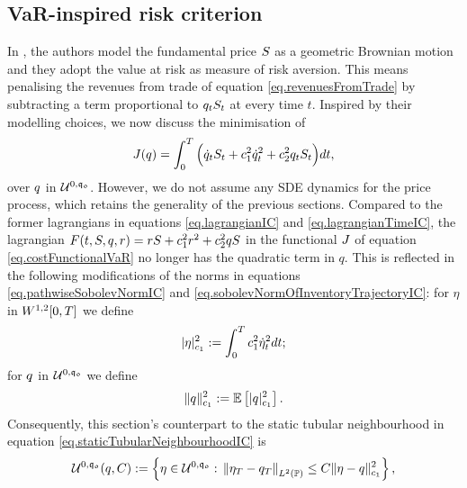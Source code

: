 \documentclass[10pt,a4paper]{article}
\begin{document}
\subsection{VaR-inspired risk criterion}\label{sec.varInspiredRiskCriterion}
In \cite{GS11opt}, the authors model the fundamental price $\fundamentalPrice$ as a geometric Brownian motion and they adopt the value at risk as measure of risk aversion. This means penalising the revenues from trade of equation \eqref{eq.revenuesFromTrade} by subtracting a term proportional to $\inventory_t \fundamentalPrice_t$ at every time $t$. Inspired by their modelling choices, we now discuss the minimisation of 
\begin{equation}\label{eq.costFunctionalVaR}
\costFunctional(\inventory)=
\int_{0}^{\timeHorizon} 
\Big(
 \inventoryRate_{t} \fundamentalPrice_t + \coeffMarketImpact\squared \inventoryRate_{t}\squared + \coeffRiskAversion\squared \inventory_t \fundamentalPrice_t
\Big)
dt,
\end{equation}
over $\inventory$ in $\spaceUnbiasedInventoryTrajectoriesInitialConstraint$. However, we do not assume any SDE dynamics for the price process, which retains the generality of the previous sections. Compared to the former lagrangians in equations \eqref{eq.lagrangianIC} and \eqref{eq.lagrangianTimeIC}, the lagrangian $F(t,S,q,r)= r S + \coeffMarketImpact\squared r\squared + \coeffRiskAversion\squared q \fundamentalPrice$ in the functional $\costFunctional$ of equation \eqref{eq.costFunctionalVaR}  no longer has the quadratic term in $q$. This is reflected
 in the following modifications of the norms in equations \eqref{eq.pathwiseSobolevNormIC} and \eqref{eq.sobolevNormOfInventoryTrajectoryIC}: for $\eta$ in $\sobolevSpaceOneTwo\timeWindow$ we define
\begin{equation}\label{eq.pathwiseSobolevNormVaR}
\lvert \eta \rvert \squared _{\coeffMarketImpact}:= \intZeroTimeHorizon \coeffMarketImpact\squared \dotEta\squared_t dt;
\end{equation}
for $\inventory$ in $\spaceUnbiasedInventoryTrajectoriesInitialConstraint$ we define
\begin{equation}\label{eq.sobolevNormVaR}
\lVert \inventory \rVert\squared_{\coeffMarketImpact}
:=
\Expectation \left[ \lvert \inventory \rvert_{\coeffMarketImpact}\squared \right].
\end{equation}
Consequently, this section's counterpart to the static tubular neighbourhood in equation \eqref{eq.staticTubularNeighbourhoodIC} is  
\begin{equation}\label{eq.staticTubularNeighbourhoodVaR}
\spaceUnbiasedInventoryTrajectoriesInitialConstraint (\inventory, C):=
\left\lbrace
\eta \in \spaceUnbiasedInventoryTrajectoriesInitialConstraint: \, 
\norm[\eta_\timeHorizon -\inventory_\timeHorizon]_{\Ltwo(\Prob)} \leq 
C \lVert \eta -\inventory\rVert\squared_{\coeffMarketImpact }
\right\rbrace,
\end{equation}
\end{document}
